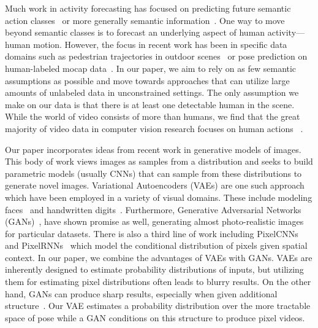  Much work in activity forecasting has focused on predicting future semantic action classes~\cite{Savarese14, Ma16, Hoai14} or more generally semantic information~\cite{Vondrick15, RhinehartK16a}. One way to move beyond semantic classes is to forecast an underlying aspect of human activity---human motion. However, the focus in recent work has been in specific data domains such as pedestrian trajectories in outdoor scenes~\cite{Kitani12, Savarese16b, Savarese16c} or pose prediction on human-labeled mocap data~\cite{Jain16,Fragikiadaki15}. In our paper, we aim to rely on as few semantic assumptions as possible and move towards approaches that can utilize large amounts of unlabeled data in unconstrained settings. The only assumption we make on our data is that there is at least one detectable human in the scene. While the world of video consists of more than humans, we find that the great majority of video data in computer vision research focuses on human actions ~\cite{Soomro12, Kuehne11, ActivityNet, Sports1m, THUMOS, Sigurdsson16}.

 Our paper incorporates ideas from recent work in generative models of images.
This body of work views images as samples from a distribution and seeks to build parametric models (usually CNNs) that can sample from these distributions to generate novel images.
Variational Autoencoders (VAEs) are one such approach which have been employed in a variety of visual domains. These include modeling faces~\cite{Kingma14a,Rezende14} and handwritten digits~\cite{Kingma14a,Salimans15}. Furthermore, Generative Adversarial Networks (GANs)~\cite{Goodfellow14, Radford15, Isola16, Denton15, Pathak16}, have shown promise as well, generating almost photo-realistic images for particular datasets. There is also a third line of work including PixelCNNs and PixelRNNs~\cite{Oord16a, Oord16b} which model the conditional distribution of pixels given spatial context.
In our paper, we combine the advantages of VAEs with GANs. VAEs are inherently designed to estimate probability distributions of inputs, but utilizing them for estimating pixel distributions often leads to blurry results. On the other hand, GANs can produce sharp results, especially when given additional structure~\cite{Wang16, Isola16, Pathak16, Reed16}. Our VAE estimates a probability distribution over the more tractable space of pose while a GAN conditions on this structure to produce pixel videos.

